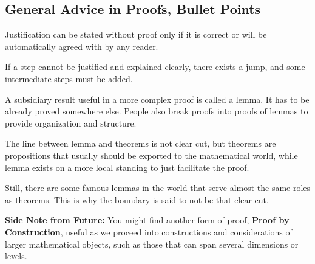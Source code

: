 \subsection{General Advice in Proofs, Bullet Points}
\begin{bindenum}
    \item Justification can be stated without proof only if it is correct or will be automatically agreed with by any reader.
    \item If a step cannot be justified and explained clearly, there exists a jump, and some intermediate steps must be added.
    \item A subsidiary result useful in a more complex proof is called a lemma. It has to be already proved somewhere else. People also break proofs into proofs of lemmas to provide organization and structure.
    \item The line between lemma and theorems is not clear cut, but theorems are propositions that usually should be exported to the mathematical world, while lemma exists on a more local standing to just facilitate the proof.
    \item Still, there are some famous lemmas in the world that serve almost the same roles as theorems. This is why the boundary is said to not be that clear cut.
\end{bindenum}

\textbf{Side Note from Future:} You might find another form of proof, \textbf{Proof by Construction}, useful as we proceed into constructions and considerations of larger mathematical objects, such as those that can span several dimensions or levels.
